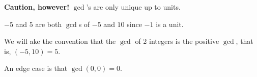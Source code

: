 \textbf{Caution, however!} $\gcd$'s are only unique up to units.

\begin{example*}
    $-5$ and $5$ are both $\gcd$s of $-5$ and $10$ since $-1$ is a unit.
\end{example*}

We will ake the convention that the $\gcd$ of 2 integers is the positive $\gcd$, that is, $(-5, 10) = 5$.

An edge case is that $\gcd(0, 0)=0$.

